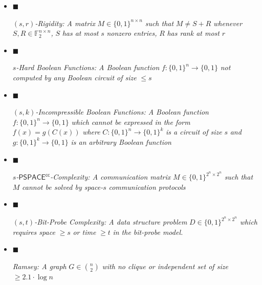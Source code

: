 \begin{itemize}


\item[] 
$\blacksquare$ 


$(s,r)$\emph{-Rigidity: A matrix }$M\in\{0,1\}^{n\times n}$\emph{ such that }$M\neq S+R$\emph{ whenever }$S,R\in\mathbb{F}_{2}^{n\times n}$\emph{, }$S$\emph{ has at most }$s$\emph{ nonzero entries, }$R$\emph{ has rank at most }$r$\emph{}\par





\item[] 
$\blacksquare$ 


$s$\emph{-Hard Boolean Functions: A Boolean function }$f:\{0,1\}^{n}\to\{0,1\}$\emph{ not computed by any Boolean circuit of size }$\leq s$\emph{}\par





\item[] 
$\blacksquare$ 


$(s,k)$\emph{-Incompressible Boolean Functions: A Boolean function }$f:\{0,1\}^{n}\to\{0,1\}$\emph{ which cannot be expressed in the form }$f(x)=g(C(x))$\emph{ where }$C:\{0,1\}^{n}\to\{0,1\}^{k}$\emph{ is a circuit of size }$s$\emph{ and }$g:\{0,1\}^{k}\to\{0,1\}$\emph{ is an arbitrary Boolean function}\par





\item[] 
$\blacksquare$ 


$s$\emph{-}${\mathsf{PSPACE}}^{{\mathsf{cc}}}$\emph{-Complexity: A communication matrix }$M\in\{0,1\}^{2^{n}\times 2^{n}}$\emph{ such that }$M$\emph{ cannot be solved by space-}$s$\emph{ communication protocols}\par





\item[] 
$\blacksquare$ 


$(s,t)$\emph{-Bit-Probe Complexity: A data structure problem }$D\in\{0,1\}^{2^{n}\times 2^{n}}$\emph{ which requires space }$\geq s$\emph{ or time }$\geq t$\emph{ in the bit-probe model.}\par





\item[] 
$\blacksquare$ 


\emph{Ramsey: A graph }$G\in\binom{n}{2}$\emph{ with no clique or independent set of size }$\geq 2.1\cdot\log n$\emph{}\par





\end{itemize}



